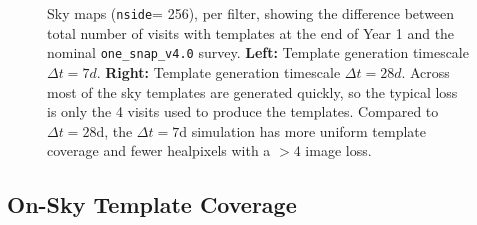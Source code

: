 \documentclass[preprintm,linenumbers]{aastex631}
\newcommand{\baseline}{\texttt{one\_snap\_v4.0}\xspace}
\newcommand{\nside}{\texttt{nside}\xspace}
\begin{document}
\begin{figure}
\begin{tabular}{c c c}
			\end{tabular}
			\caption{Sky maps (\nside = 256), per filter, showing the  difference between total number of visits with templates at the end of Year 1 and the nominal \baseline survey. \textbf{Left:} Template generation timescale $\Delta t = 7 \si{d}$.  \textbf{Right:} Template generation timescale $\Delta t = 28 \si{d}$. Across most of the sky templates are generated quickly, so the typical loss is only the 4 visits used to produce the templates. 
   Compared to $\Delta t = 28$d, the $\Delta t = 7$d simulation has more uniform template coverage and fewer healpixels with a $>4$ image loss.  
			}
			\label{fig:template_skymaps_delta-7_28days}
		\end{figure}
		
		
		
		
		
		
		
		
		\subsection{On-Sky Template Coverage}
		\label{sec:template_coverage}
		
\end{document}
